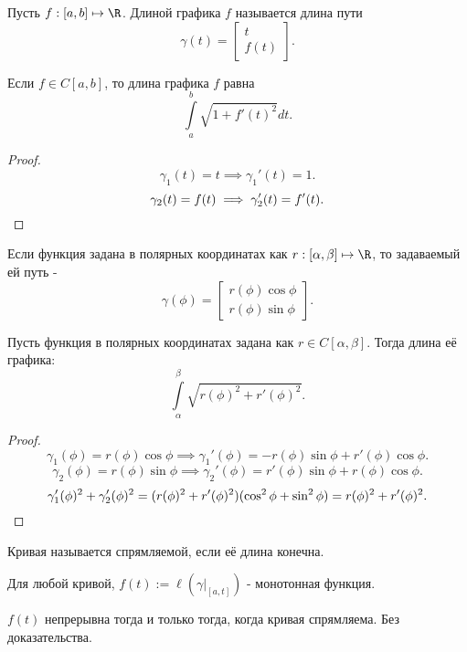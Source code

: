 \begin{definition} \thmslashn 

    Пусть $f : [a, b] \mapsto \R$. Длиной графика $f$ называется длина пути 
    \[ \gamma(t) = \begin{bmatrix} t\\ f(t) \end{bmatrix}  .\] 
\end{definition}
\begin{consequence} \thmslashn

    Если $f\in C[a, b]$, то длина графика $f$ равна
    \[ \int\limits_{a}^{b} \sqrt{1 + f'(t)^2}dt    .\] 
    \begin{proof} \thmslashn
    
        \[ \gamma_1(t) = t \implies \gamma_1'(t) = 1 .\]
        \[ \gamma_2(t) = f(t) \implies \gamma_2'(t) = f'(t).\qedhere\] 
    \end{proof}
\end{consequence}
\begin{definition} \thmslashn 

    Если функция задана в полярных координатах как $r : [\alpha, \beta] \mapsto \R$, то задаваемый ей путь - 
    \[ \gamma(\phi) = \begin{bmatrix} r(\phi)\cos \phi\\ r(\phi)\sin \phi \end{bmatrix}  .\] 
\end{definition}
\begin{consequence} \thmslashn

    Пусть функция в полярных координатах задана как  $r\in C[\alpha, \beta]$. Тогда длина её графика:
    \[ \int\limits_{\alpha}^{\beta} \sqrt{r(\phi)^2 + r'(\phi)^2}   .\]
    \begin{proof} \thmslashn
    
        \[ \gamma_1(\phi) = r(\phi)\cos \phi \implies \gamma_1'(\phi) = -r(\phi)\sin \phi + r'(\phi)\cos \phi .\] 
        \[ \gamma_2(\phi) = r(\phi)\sin \phi \implies \gamma_2'(\phi) = r'(\phi)\sin \phi + r(\phi)\cos \phi .\]
        \[ \gamma_1'(\phi)^2 + \gamma_2'(\phi)^2 = (r(\phi)^2 + r'(\phi)^2)(\cos^2 \phi +\sin^2 \phi) = r(\phi)^2 + r'(\phi)^2.\qedhere\] 
    \end{proof}
\end{consequence}
\begin{definition} \thmslashn 

    Кривая называется спрямляемой, если её длина конечна.
\end{definition}
\begin{consequence} \thmslashn

    Для любой кривой, $f(t) := \ell\left( \left. \gamma\right|_{[a, t]} \right) $ - монотонная функция.

        $f(t)$ непрерывна тогда и только тогда, когда кривая спрямляема. Без доказательства.
\end{consequence}
